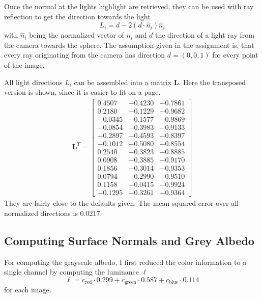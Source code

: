 \documentclass{paper}
\begin{document}
Once the normal at the lights highlight are retrieved, they can be used with ray reflection to get the direction towards the light
\begin{equation}
	L_i = d - 2(d\cdot \hat{n}_i)\hat{n}_i
\end{equation}
with $\hat{n}_i$ being the normalized vector of $n_i$ and $d$ the direction of a light ray from the camera towards the sphere.
The assumption given in the assignment is, 
that every ray originating from the camera has direction $d = (0,0,1)$ for every point of the image.

All light directions $L_i$ can be assembled into a matrix $\mathbf{L}$. Here the
transposed version is shown, since it is easier to fit on a page.
\begin{align*}
\mathbf{L}^T= 
\left[ 
\begin{array}{cccccccccccccc}
0.4507 & -0.4230 & -0.7861 \\ 0.2180 & -0.1229 & -0.9682 \\ -0.0345 & -0.1577 & -0.9869 \\ -0.0854 & -0.3983 & -0.9133 \\ -0.2897 & -0.4593 & -0.8397 \\ -0.1012 & -0.5080 & -0.8554 \\ 0.2540 & -0.3823 & -0.8885 \\ 0.0908 & -0.3885 & -0.9170 \\ 0.1856 & -0.3014 & -0.9353 \\ 0.0794 & -0.2990 & -0.9510 \\ 0.1158 & -0.0415 & -0.9924 \\ -0.1295 & -0.3261 & -0.9364 
\end{array} 
\right] 
\end{align*}
They are fairly close to the defaults given. The mean squared error over all normalized directions is 0.0217.

\subsection{Computing Surface Normals and Grey Albedo}


For computing the grayscale albedo, I first reduced the color information to a single channel by computing the luminance $\ell$
\begin{equation}
	\ell = c_\text{red} \cdot 0.299 + 
		c_\text{green} \cdot 0.587 + 
		c_\text{blue} \cdot 0.114
\end{equation}
for each image. 
\end{document}

